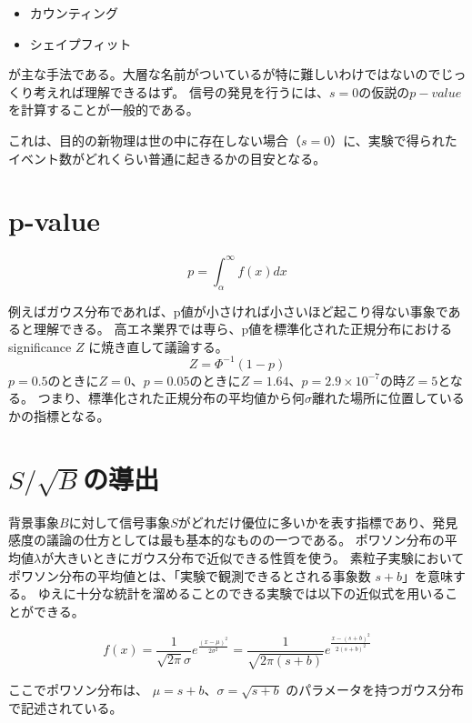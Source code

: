 \documentclass[oneside, uplatex]{jsbook}
\begin{document}
\begin{itemize}
  \item カウンティング
  \item シェイプフィット
\end{itemize}

が主な手法である。大層な名前がついているが特に難しいわけではないのでじっくり考えれば理解できるはず。
信号の発見を行うには、$s=0$の仮説の$p-value$を計算することが一般的である。

これは、目的の新物理は世の中に存在しない場合（$s=0$）に、実験で得られたイベント数がどれくらい普通に起きるかの目安となる。

\section{p-value}

\begin{equation}
  p = \int_{\alpha}^{\infty} f(x)dx
\end{equation}

例えばガウス分布であれば、p値が小さければ小さいほど起こり得ない事象であると理解できる。
高エネ業界では専ら、p値を標準化された正規分布におけるsignificance $Z$ に焼き直して議論する。
\begin{equation}
  Z = \Phi^{-1}(1-p)
\end{equation}
$p=0.5$のときに$Z=0$、$p=0.05$のときに$Z=1.64$、$p=2.9\times 10^{-7}$の時$Z=5$となる。
つまり、標準化された正規分布の平均値から何$\sigma$離れた場所に位置しているかの指標となる。

\section{$S/\sqrt{B}$の導出}
背景事象$B$に対して信号事象$S$がどれだけ優位に多いかを表す指標であり、発見感度の議論の仕方としては最も基本的なものの一つである。
ポワソン分布の平均値$\lambda$が大きいときにガウス分布で近似できる性質を使う。
素粒子実験においてポワソン分布の平均値とは、「実験で観測できるとされる事象数 $s+b$」を意味する。
ゆえに十分な統計を溜めることのできる実験では以下の近似式を用いることができる。

\begin{equation}
  f(x)
  = \frac{1}{\sqrt{2\pi}\sigma} e^{\frac{(x-\mu)^2}{2\sigma^2}}
  = \frac{1}{\sqrt{2\pi(s+b)}} e^{\frac{{x-(s+b)}^2}{2(s+b)^2}}
\end{equation}

ここでポワソン分布は、 $\mu = s+b$、$\sigma = \sqrt{s+b}$
のパラメータを持つガウス分布で記述されている。
\end{document}
